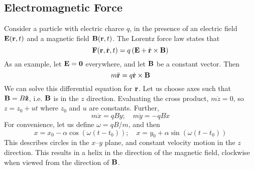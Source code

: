 \subsection{Electromagnetic Force}
Consider a particle with electric charce $q$, in the presence of an electric field $\vb E(\vb r, t)$ and a magnetic field $\vb B(\vb r, t)$. The Lorentz force law states that
\[ \vb F(\vb r, \dot{\vb r}, t) = q\left( \vb E + \dot{\vb r} \times \vb B \right) \]
As an example, let $\vb E = \vb 0$ everywhere, and let $\vb B$ be a constant vector. Then
\[ m \ddot{\vb r} = q \dot{\vb r} \times \vb B \]
We can solve this differential equation for $\vb r$. Let us choose axes such that $\vb B = B \vu{z}$, i.e. $\vb B$ is in the $z$ direction. Evaluating the cross product, $m \ddot{z} = 0$, so $z = z_0 + ut$ where $z_0$ and $u$ are constants. Further,
\[ m \ddot x = qB\dot y;\quad m \ddot y = -qB\dot x \]
For convenience, let us define $\omega = qB/m$, and then
\[ x = x_0 - \alpha \cos(\omega(t - t_0));\quad x = y_0 + \alpha \sin(\omega(t - t_0)) \]
This describes circles in the $x$--$y$ plane, and constant velocity motion in the $z$ direction. This results in a helix in the direction of the magnetic field, clockwise when viewed from the direction of $\vb B$.
